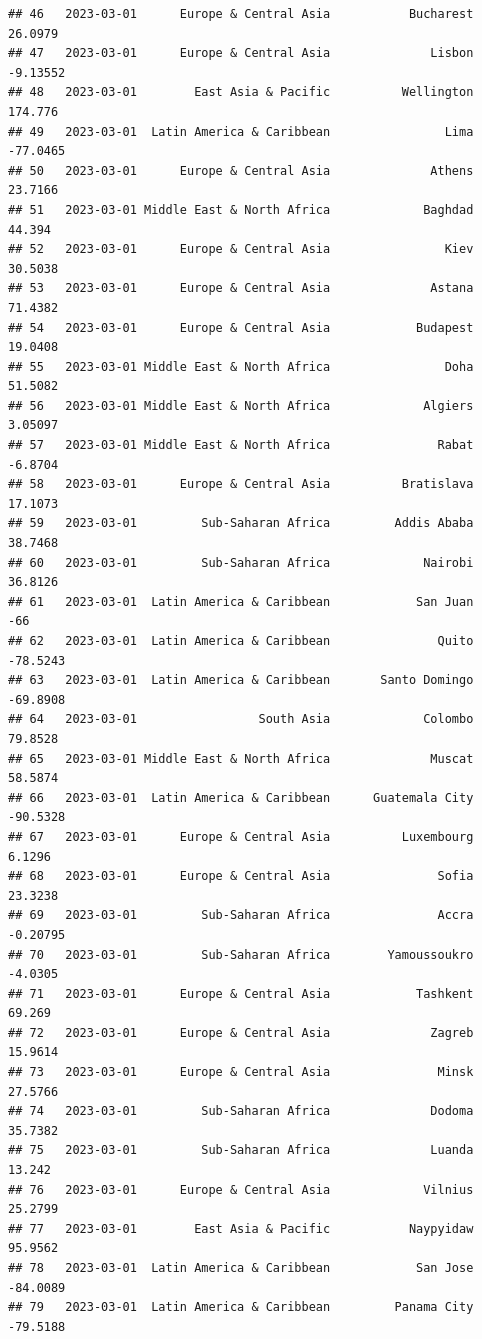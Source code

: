 \documentclass[
]{article}
\begin{document}
\begin{verbatim}
## 46   2023-03-01      Europe & Central Asia           Bucharest    26.0979
## 47   2023-03-01      Europe & Central Asia              Lisbon   -9.13552
## 48   2023-03-01        East Asia & Pacific          Wellington    174.776
## 49   2023-03-01  Latin America & Caribbean                Lima   -77.0465
## 50   2023-03-01      Europe & Central Asia              Athens    23.7166
## 51   2023-03-01 Middle East & North Africa             Baghdad     44.394
## 52   2023-03-01      Europe & Central Asia                Kiev    30.5038
## 53   2023-03-01      Europe & Central Asia              Astana    71.4382
## 54   2023-03-01      Europe & Central Asia            Budapest    19.0408
## 55   2023-03-01 Middle East & North Africa                Doha    51.5082
## 56   2023-03-01 Middle East & North Africa             Algiers    3.05097
## 57   2023-03-01 Middle East & North Africa               Rabat    -6.8704
## 58   2023-03-01      Europe & Central Asia          Bratislava    17.1073
## 59   2023-03-01         Sub-Saharan Africa         Addis Ababa    38.7468
## 60   2023-03-01         Sub-Saharan Africa             Nairobi    36.8126
## 61   2023-03-01  Latin America & Caribbean            San Juan        -66
## 62   2023-03-01  Latin America & Caribbean               Quito   -78.5243
## 63   2023-03-01  Latin America & Caribbean       Santo Domingo   -69.8908
## 64   2023-03-01                 South Asia             Colombo    79.8528
## 65   2023-03-01 Middle East & North Africa              Muscat    58.5874
## 66   2023-03-01  Latin America & Caribbean      Guatemala City   -90.5328
## 67   2023-03-01      Europe & Central Asia          Luxembourg     6.1296
## 68   2023-03-01      Europe & Central Asia               Sofia    23.3238
## 69   2023-03-01         Sub-Saharan Africa               Accra   -0.20795
## 70   2023-03-01         Sub-Saharan Africa        Yamoussoukro    -4.0305
## 71   2023-03-01      Europe & Central Asia            Tashkent     69.269
## 72   2023-03-01      Europe & Central Asia              Zagreb    15.9614
## 73   2023-03-01      Europe & Central Asia               Minsk    27.5766
## 74   2023-03-01         Sub-Saharan Africa              Dodoma    35.7382
## 75   2023-03-01         Sub-Saharan Africa              Luanda     13.242
## 76   2023-03-01      Europe & Central Asia             Vilnius    25.2799
## 77   2023-03-01        East Asia & Pacific           Naypyidaw    95.9562
## 78   2023-03-01  Latin America & Caribbean            San Jose   -84.0089
## 79   2023-03-01  Latin America & Caribbean         Panama City   -79.5188

\end{verbatim}
\end{document}
